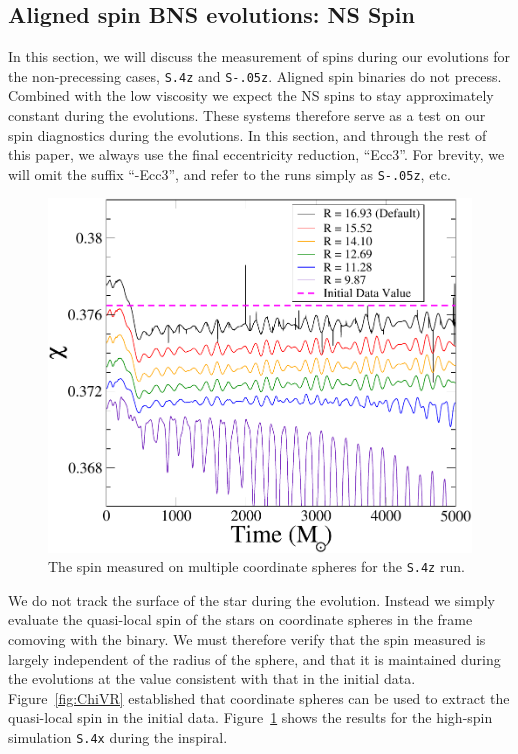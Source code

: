 {%
\subsection{Aligned spin BNS evolutions: NS Spin}
\label{sec:EvolutionSpin}

In this section, we will discuss the measurement of spins during our
evolutions for the non-precessing cases, {\tt S.4z} and {\tt S-.05z}.  Aligned
spin binaries do not precess.  Combined with the low viscosity we
expect the NS spins to stay approximately constant during the
evolutions.  These systems therefore serve as a test on our spin
diagnostics during the evolutions.
In this section, and through the rest of this paper, we always use the
final eccentricity reduction, ``Ecc3''.  For brevity, we will omit the
suffix ``-Ecc3'', and refer to the runs simply as {\tt S-.05z}, etc.

\begin{figure}
\includegraphics[width=0.95\columnwidth]{chap2/ChiVTZoomed}
\caption[The spin measured on multiple
  coordinate spheres for the {\tt S.4z} run.]{{\label{fig:ChiVTZoomed}} The spin measured on multiple
  coordinate spheres for the {\tt S.4z} run.}
\end{figure}

We do not track the surface of the star during the evolution.
Instead we simply evaluate the quasi-local spin of the stars on
coordinate spheres in the frame comoving with the binary.  We must
therefore verify that the spin measured is largely independent of the
radius of the sphere, and that it is maintained during the evolutions
at the value consistent with that in the initial data.
Figure~\ref{fig:ChiVR} established that coordinate spheres can be used
to extract the quasi-local spin in the initial data.
Figure~\ref{fig:ChiVTZoomed} shows the results for the high-spin
simulation {\tt S.4x} during the inspiral.

}
